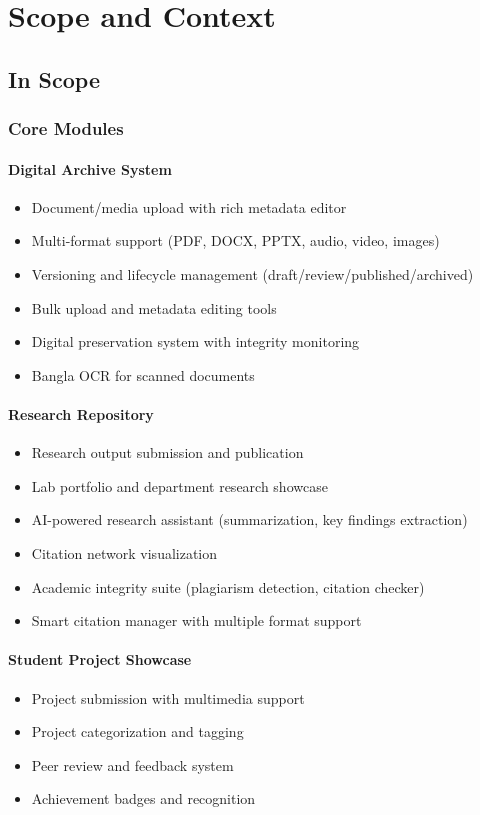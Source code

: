 \documentclass[12pt,a4paper]{report}
\begin{document}
\chapter{Scope and Context}

\section{In Scope}

\subsection{Core Modules}

\subsubsection{Digital Archive System}
\begin{itemize}
    \item Document/media upload with rich metadata editor
    \item Multi-format support (PDF, DOCX, PPTX, audio, video, images)
    \item Versioning and lifecycle management (draft/review/published/archived)
    \item Bulk upload and metadata editing tools
    \item Digital preservation system with integrity monitoring
    \item Bangla OCR for scanned documents
\end{itemize}

\subsubsection{Research Repository}
\begin{itemize}
    \item Research output submission and publication
    \item Lab portfolio and department research showcase
    \item AI-powered research assistant (summarization, key findings extraction)
    \item Citation network visualization
    \item Academic integrity suite (plagiarism detection, citation checker)
    \item Smart citation manager with multiple format support
\end{itemize}

\subsubsection{Student Project Showcase}
\begin{itemize}
    \item Project submission with multimedia support
    \item Project categorization and tagging
    \item Peer review and feedback system
    \item Achievement badges and recognition
\end{itemize}
\end{document}
